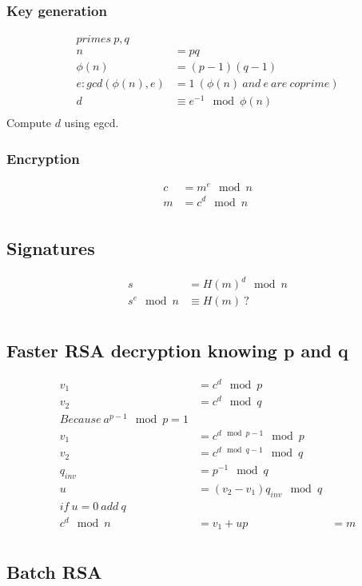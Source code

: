 \documentclass{article}
\begin{document}
\subsubsection{Key generation}
\begin{align*}
primes~p, q \\
n &= pq \\
\phi(n) &= (p-1)(q-1) \\
e : gcd(\phi(n), e) &= 1~(\phi(n)~and~e~are~coprime) \\
d &\equiv e^{-1} \mod \phi(n) \\
\end{align*}
Compute $d$ using egcd.

\subsubsection{Encryption}
\begin{align*}
    c &= m^e \mod n \\
    m &= c^d \mod n \\
\end{align*}

\subsection{Signatures}
\begin{align*}
s &= H(m)^d \mod n \\
 s^e \mod n &\equiv H(m)~? \\
\end{align*}

\subsection{Faster RSA decryption knowing p and q}
\begin{align*}
v_1 &= c^d \mod p \\
v_2 &= c^d \mod q \\
Because~a^{p-1} \mod p = 1 \\
v_1 &= c^{d \mod p-1} \mod p \\
v_2 &= c^{d \mod q-1} \mod q \\
q_{inv} &= p^{-1} \mod q \\
u &= (v_2 - v_1)q_{inv} \mod q \\
if~u=0~add~q\\
c^d \mod n &= v_1 + up &= m \\
\end{align*}

\subsection{Batch RSA}
\end{document}
